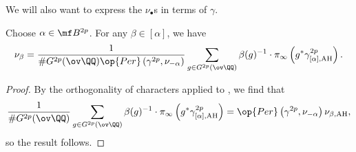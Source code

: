 \documentclass[../thesis.tex]{subfiles}
\begin{document}
We will also want to express the $\nu_\bullet$s in terms of $\gamma$.
\begin{corollary} \label{cor:fermat-hodge-basis-by-abs-hodge}
	Choose $\alpha\in\mf B^{2p}$. For any $\beta\in[\alpha]$, we have
	\[\nu_{\beta}=\frac1{\#G^{2p}(\ov\QQ)\op{Per}\left(\gamma^{2p},\nu_{-\alpha}\right)}\sum_{g\in G^{2p}(\ov\QQ)}\beta(g)^{-1}\cdot\pi_\infty\left(g^*\gamma^{2p}_{[\alpha],\mathrm{AH}}\right).\]
\end{corollary}
\begin{proof}
	By the orthogonality of characters applied to , we find that
	\[\frac1{\#G^{2p}(\ov\QQ)}\sum_{g\in G^{2p}(\ov\QQ)}\beta(g)^{-1}\cdot \pi_\infty\left(g^*\gamma^{2p}_{[\alpha],\mathrm{AH}}\right)=\op{Per}\left(\gamma^{2p},\nu_{-\alpha}\right)\nu_{\beta,\mathrm{AH}},\]
	so the result follows.
\end{proof}

\end{document}
